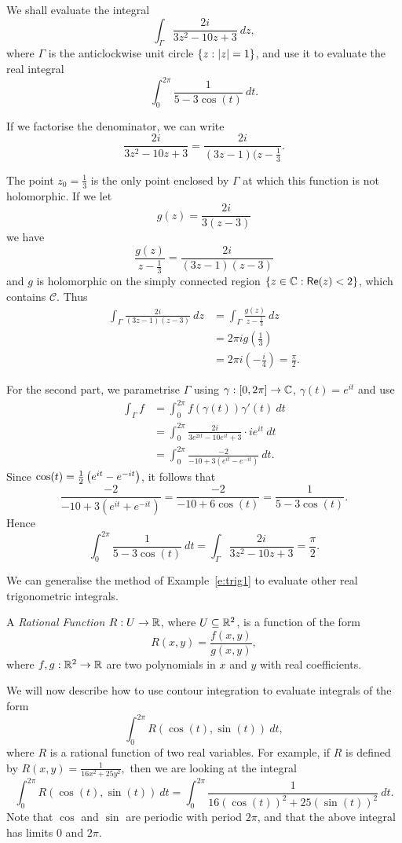 \begin{example}
\label{e:trig1}
We shall evaluate the integral
\[
\int_{\Gamma} \frac{2i}{3z^2-10z+3}\ dz,
\]
where $\Gamma$ is the anticlockwise unit circle $\left\{z: \left| z \right|=1\right\}$, and use it to evaluate the real integral
\[
\int_0^{2\pi} \frac{1}{5-3\cos(t)}\ dt.
\]
\end{example}
\begin{solution}
If we factorise the denominator, we can write
\[
\frac{2i}{3z^2-10z+3} = \frac{2i}{(3z-1)(z-\frac{1}{3}}.
\]

The point $z_0=\frac{1}{3}$ is the only point enclosed by $\Gamma$ at which this function is not holomorphic.  If we let
\[
g(z) = \frac{2i}{3(z-3)}
\]
we have
\[
\frac{g(z)}{z-\frac{1}{3}} = \frac{2i}{(3z-1)(z-3)}
\]
and $g$ is holomorphic on the simply connected region $\left\{z \in \mathbb{C}: \textsf{Re} (z) < 2\right\}$, which contains $\mathcal{C}$.  Thus
\begin{align*}
\int_{\Gamma} \frac{2i}{(3z-1)(z-3)}\ dz & = \int_{\Gamma} \frac{g(z)}{z-\frac{1}{3}}\ dz \\
& = 2\pi i g(\tfrac{1}{3}) \\
& = 2\pi i \left( - \frac{i}{4} \right) = \frac{\pi}{2}.
\end{align*}

For the second part, we parametrise $\Gamma$ using $\gamma:[0,2\pi]\to \mathbb{C}$, $\gamma(t)=e^{it}$ and use
\begin{align*}
\int_{\Gamma} f &= \int_0^{2\pi} f ( \gamma(t) ) \gamma'(t)\ dt \\
& = \int_0^{2\pi} \frac{2i}{3e^{2it}-10e^{it}+3}\cdot i e^{it}\ dt \\
& = \int_0^{2\pi} \frac{-2}{-10+3(e^{it}-e^{-it})}\ dt.
\end{align*}
Since $\cos(t) = \frac{1}{2}\left( e^{it}-e^{-it} \right)$, it follows that
\[
\frac{-2}{-10+3(e^{it}+e^{-it})} = \frac{-2}{-10+6\cos(t)} = \frac{1}{5-3\cos(t)}.
\]
Hence
\[
\int_0^{2\pi} \frac{1}{5-3\cos(t)}\ dt = \int_{\Gamma} \frac{2i}{3z^2-10z+3} = \frac{\pi}{2}.
\]
\end{solution}


We can generalise the method of Example~\ref{e:trig1} to evaluate other real trigonometric integrals.
\begin{definition}
A \emph{Rational Function} $R:U \to \mathbb{R}$, where $U \subseteq \mathbb{R}^2$, is a function of the form
\[
R(x,y) = \frac{f(x,y)}{g(x,y)},
\]
where $f,g: \mathbb{R}^2 \to \mathbb{R}$ are two polynomials in $x$ and $y$ with real coefficients.
\end{definition}
We will now describe how to use contour integration to evaluate integrals of the form
\[
\int_0^{2\pi} R( \cos (t), \sin (t) )\ dt,
\]
where $R$ is a rational function of two real variables. For example, if $R$ is defined by
$
\displaystyle R(x,y) = \frac{1}{16x^2+25y^2},
$
then we are looking at the integral
\[
\int_0^{2\pi} R(\cos (t) , \sin (t) )\ dt = \int_0^{2\pi} \frac{1}{16 \left( \cos (t) \right)^2+25 \left( \sin (t) \right)^2}\ dt.
\]
Note that $\cos$ and $\sin$ are periodic with period $2\pi$, and that the above integral has limits $0$ and $2\pi$.

